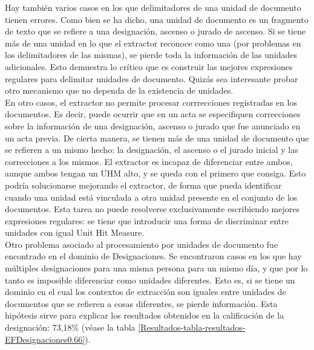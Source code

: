 Hay también varios casos en los que delimitadores de una unidad de documento tienen errores. Como bien se ha dicho, una unidad de documento es un fragmento de texto que se refiere a una designación, ascenso o jurado de ascenso. Si se tiene más de una unidad en lo que el extractor reconoce como una (por problemas en los delimitadores de las mismas), se pierde toda la información de las unidades adicionales. Esto demuestra lo crítico que es construir las mejores expresiones regulares para delimitar unidades de documento. Quizás sea interesante probar otro mecanismo que no dependa de la existencia de unidades.  \\

En otro casos, el extractor no permite procesar corrrecciones registradas en los documentos. Es decir, puede ocurrir que en un acta se especifiquen correcciones sobre la información de una designación, ascenso o jurado que fue anunciado en un acta previa. De cierta manera, se tienen más de una unidad de documento que se refieren a un mismo hecho: la designación, el ascenso o el jurado inicial y las correcciones a los mismos. El extractor es incapaz de diferenciar entre ambos, aunque ambos tengan un UHM alto, y se queda con el primero que consiga. Esto podría solucionarse mejorando el extractor, de forma que pueda identificar cuando una unidad está vinculada a otra unidad presente en el conjunto de los documentos. Esta tarea no puede resolverse exclusivamente escribiendo mejores expresiones regulares: se tiene que introducir una forma de discriminar entre unidades con igual Unit Hit Measure.\\

Otro problema asociado al procesamiento por unidades de documento fue encontrado en el dominio de Designaciones. Se encontraron casos en los que hay múltiples designaciones para una misma persona para un mismo día, y que por lo tanto es imposible diferenciar como unidades diferentes. Esto es, si se tiene un dominio en el cual los contextos de extracción son iguales entre unidades de documentos que se refieren a cosas diferentes, se pierde información. Esta hipótesis sirve para explicar los resultados obtenidos en la calificación de la designación: 73,18\% (véase la tabla \ref{Resultados-tabla-resultados-EFDesignaciones0.66}). \\

